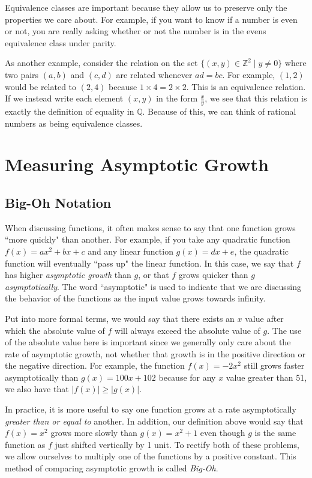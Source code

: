 \documentclass[11pt,oneside]{book}
\theoremstyle{definition}
\begin{document}
Equivalence classes are important because they allow us to preserve only the properties we care about.
For example, if you want to know if a number is even or not, you are really asking whether or not the number is in the evens equivalence class under parity.

As another example, consider the relation on the set $\{ (x, y) \in \mathbb{Z}^{2} \mid y \neq 0 \}$ where two pairs $(a, b)$ and $(c, d)$ are related whenever $ad = bc$.
For example, $(1, 2)$ would be related to $(2, 4)$ because $1 \times 4 = 2 \times 2$.
This is an equivalence relation.
If we instead write each element $(x, y)$ in the form $\frac{x}{y}$, we see that this relation is exactly the definition of equality in $\mathbb{Q}$.
Because of this, we can think of rational numbers as being equivalence classes.



\chapter{Measuring Asymptotic Growth}
\section{Big-Oh Notation}
When discussing functions, it often makes sense to say that one function grows ``more quickly" than another.
For example, if you take any quadratic function $f(x) = ax^{2} + bx + c$ and any linear function $g(x) = dx + e$, the quadratic function will eventually ``pass up" the linear function.
In this case, we say that $f$ has higher \emph{asymptotic growth} than $g$, or that $f$ grows quicker than $g$ \emph{asymptotically}.
The word ``asymptotic" is used to indicate that we are discussing the behavior of the functions as the input value grows towards infinity.

Put into more formal terms, we would say that there exists an $x$ value after which the absolute value of $f$ will always exceed the absolute value of $g$.
The use of the absolute value here is important since we generally only care about the rate of asymptotic growth, not whether that growth is in the positive direction or the negative direction.
For example, the function $f(x) = -2x^{2}$ still grows faster asymptotically than $g(x) = 100x + 102$ because for any $x$ value greater than 51, we also have that $|f(x)| \geq |g(x)|$.

In practice, it is more useful to say one function grows at a rate asymptotically \emph{greater than or equal to} another.
In addition, our definition above would say that $f(x) = x^{2}$ grows more slowly than $g(x) = x^{2} + 1$ even though $g$ is the same function as $f$ just shifted vertically by 1 unit.
To rectify both of these problems, we allow ourselves to multiply one of the functions by a positive constant.
This method of comparing asymptotic growth is called \emph{Big-Oh}.
\end{document}
